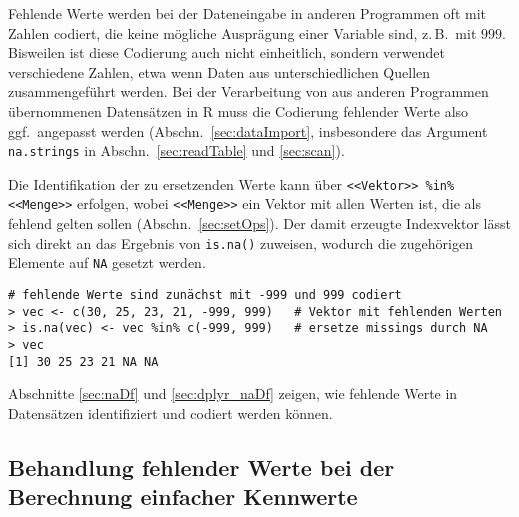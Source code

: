 Fehlende Werte werden bei der Dateneingabe in anderen Programmen oft mit Zahlen codiert, die keine mögliche Ausprägung einer Variable sind, z.\,B.\ mit $999$. Bisweilen ist diese Codierung auch nicht einheitlich, sondern verwendet verschiedene Zahlen, etwa wenn Daten aus unterschiedlichen Quellen zusammengeführt werden. Bei der Verarbeitung von aus anderen Programmen übernommenen Datensätzen in R muss die Codierung fehlender Werte also ggf.\ angepasst werden (Abschn.\ \ref{sec:dataImport}, insbesondere das Argument \lstinline!na.strings! in Abschn.\ \ref{sec:readTable} und \ref{sec:scan}).

Die Identifikation der zu ersetzenden Werte kann über \lstinline!<<Vektor>> %in% <<Menge>>! erfolgen, wobei \lstinline!<<Menge>>! ein Vektor mit allen Werten ist, die als fehlend gelten sollen (Abschn.\ \ref{sec:setOps}). Der damit erzeugte Indexvektor lässt sich direkt an das Ergebnis von \lstinline!is.na()! zuweisen, wodurch die zugehörigen Elemente auf \lstinline!NA! gesetzt werden.
\begin{lstlisting}
# fehlende Werte sind zunächst mit -999 und 999 codiert
> vec <- c(30, 25, 23, 21, -999, 999)   # Vektor mit fehlenden Werten
> is.na(vec) <- vec %in% c(-999, 999)   # ersetze missings durch NA
> vec
[1] 30 25 23 21 NA NA
\end{lstlisting}

Abschnitte \ref{sec:naDf} und \ref{sec:dplyr_naDf} zeigen, wie fehlende Werte in Datensätzen identifiziert und codiert werden können.

\subsection{Behandlung fehlender Werte bei der Berechnung einfacher Kennwerte}
\label{sec:treatNA}

